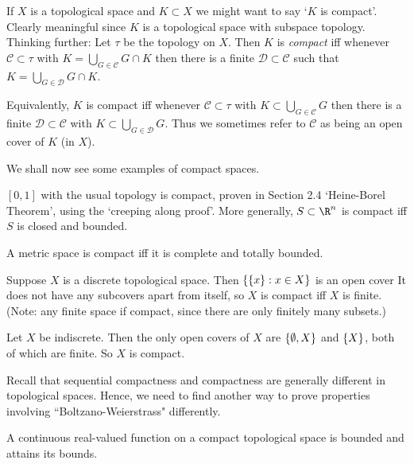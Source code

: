 \begin{remark}
    If $X$ is a topological space and $K\subset X$ we might want to say `$K$ is compact'. Clearly meaningful since $K$ is a topological space with subspace topology. Thinking further: Let $\tau$ be the topology on $X$. Then $K$ is \emph{compact} iff whenever $\mathcal{C}\subset \tau$ with $K = \bigcup_{G\in \mathcal{C}} G\cap K$ then there is a finite $\mathcal{D}\subset \mathcal{C}$ such that $K = \bigcup_{G\in \mathcal{D}} G\cap K$.

    Equivalently, $K$ is compact iff whenever $\mathcal{C}\subset \tau$ with $K\subset \bigcup_{G\in \mathcal{C}} G$ then there is a finite $\mathcal{D}\subset\mathcal{C}$ with $K\subset \bigcup_{G\in \mathcal{D}} G$. Thus we sometimes refer to $\mathcal{C}$ as being an open cover of $K$ (in $X$).
\end{remark} 

We shall now see some examples of compact spaces.
\begin{example}
    $[0,1]$ with the usual topology is compact, proven in Section 2.4 `Heine-Borel Theorem', using the `creeping along proof'. More generally, $S\subset \R^n$ is compact iff $S$ is closed and bounded.
\end{example} 

\begin{example}
    A metric space is compact iff it is complete and totally bounded.
\end{example} 

\begin{example}
    Suppose $X$ is a discrete topological space. Then $\{\{x\} : x\in X\}$ is an open cover It does not have any subcovers apart from itself, so $X$ is compact iff $X$ is finite. (Note: any finite space if compact, since there are only finitely many subsets.)
\end{example} 

\begin{example}
    Let $X$ be indiscrete. Then the only open covers of $X$ are $\{\emptyset, X\}$ and $\{X\}$, both of which are finite. So $X$ is compact.
\end{example} 

Recall that sequential compactness and compactness are generally different in topological spaces. Hence, we need to find another way to prove properties involving ``Boltzano-Weierstrass" differently.
\begin{theorem} \label{thm:33}
A continuous real-valued function on a compact topological space is bounded and attains its bounds.
\end{theorem}   

